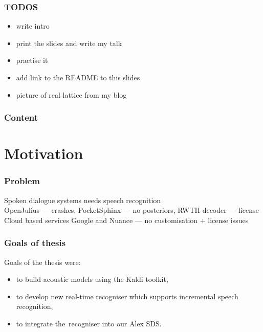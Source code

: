 

\maketitle


\begin{frame}\frametitle{TODOS} 
    \begin{itemize}
        \item write intro
        \item print the slides and write my talk
        \item practise it
        \item add link to the README to this slides
        \item picture of real lattice from my blog
    \end{itemize}
\end{frame}


\begin{frame} \frametitle{Content} \tableofcontents \end{frame}


\section{Motivation} %

\begin{frame}\frametitle{Problem} 
    Spoken dialogue systems needs speech recognition \\
    OpenJulius --- crashes, PocketSphinx --- no posteriors, RWTH decoder --- license \\
    Cloud based services Google and Nuance --- no customisation + license issues
\end{frame}

\begin{frame}\frametitle{Goals of thesis} 
Goals of the thesis were:
    \begin{itemize}
        \item to build acoustic models using the Kaldi toolkit,
        \item to develop new real-time recogniser which supports incremental speech recognition,
        \item to integrate the~recogniser into our Alex SDS.
    \end{itemize}
\end{frame}


